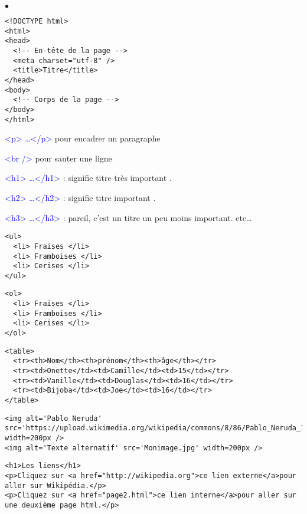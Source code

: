 \documentclass[10pt,dvipsnames, dvips, svgnames]{article}
\begin{document}
\begin{list}{$\bullet$}{}
\item 
{}
\begin{lstlisting}
<!DOCTYPE html>
<html>
<head>
  <!-- En-tête de la page -->
  <meta charset="utf-8" />
  <title>Titre</title>
</head>
<body>
  <!-- Corps de la page -->
</body>
</html>
\end{lstlisting}
\item \textcolor{Blue}{<p> \dots </p>} pour encadrer un paragraphe
\item \textcolor{Blue}{<br />} pour sauter une ligne
\item  \textcolor{Blue}{<h1> \dots </h1>} : signifie \og titre très important \fg.
\item  \textcolor{Blue}{<h2> \dots </h2>} : signifie \og titre important \fg.
\item  \textcolor{Blue}{<h3> \dots </h3>} : pareil, c'est un titre un peu moins important.  etc\dots
\item \begin{minipage}[t]{0.5\linewidth}
\begin{lstlisting}
<ul>
  <li> Fraises </li>
  <li> Framboises </li>
  <li> Cerises </li>
</ul>
\end{lstlisting}
\end{minipage}
\begin{minipage}[t]{0.5\linewidth}
\begin{lstlisting}
<ol>
  <li> Fraises </li>
  <li> Framboises </li>
  <li> Cerises </li>
</ol>
\end{lstlisting}
\end{minipage}
\item {}
\begin{lstlisting}
<table>
  <tr><th>Nom</th><th>prénom</th><th>âge</th></tr>
  <tr><td>Onette</td><td>Camille</td><td>15</td></tr>
  <tr><td>Vanille</td><td>Douglas</td><td>16</td></tr>
  <tr><td>Bijoba</td><td>Joe</td><td>16</td></tr>
</table>
\end{lstlisting}

\item {}
\begin{lstlisting}
<img alt='Pablo Neruda' src='https://upload.wikimedia.org/wikipedia/commons/8/86/Pablo_Neruda_1963.jpg' width=200px />
<img alt='Texte alternatif' src='Monimage.jpg' width=200px />
\end{lstlisting}

\item{}
\begin{lstlisting}
<h1>Les liens</h1>
<p>Cliquez sur <a href="http://wikipedia.org">ce lien externe</a>pour aller sur Wikipédia.</p>
<p>Cliquez sur <a href="page2.html">ce lien interne</a>pour aller sur une deuxième page html.</p>
\end{lstlisting}

\end{list}
\end{document}
